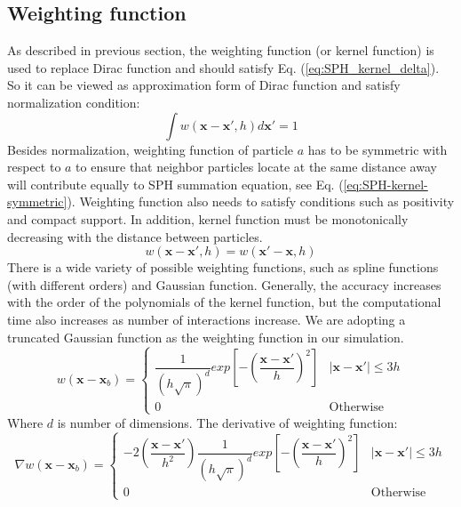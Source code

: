 \documentclass[journal abbreviation, manuscript]{copernicus}
\begin{document}
\subsection{Weighting function}
As described in previous section, the weighting function (or kernel function) is used to replace Dirac function and should satisfy Eq.  (\ref{eq:SPH_kernel_delta}). So it can be viewed as approximation form of Dirac function and satisfy normalization condition:
\begin{equation}
\int	 w(\textbf{x}-\textbf{x}\prime, h) d\textbf{x}\prime = 1
\label{eq:SPH-kernel-normalization-prop}
\end{equation}
Besides normalization, weighting function of particle $a$ has to be symmetric with respect to $a$ to ensure that neighbor particles locate at the same distance away will contribute equally to SPH summation equation, see Eq. (\ref{eq:SPH-kernel-symmetric}). Weighting function also needs to satisfy conditions such as positivity and compact support. In addition, kernel function must be monotonically decreasing with the distance between particles.\\
\begin{equation}
w(\textbf{x}- \textbf{x} \prime, h) = w(\textbf{x} \prime - \textbf{x}, h)
\label{eq:SPH-kernel-symmetric}
\end{equation}
There is a wide variety of possible weighting functions, such as spline functions (with different orders) and Gaussian function. Generally, the accuracy increases with the order of the polynomials of the kernel function, but the computational time also increases as number of interactions increase. 
We are adopting a truncated Gaussian function as the weighting function in our simulation.
\begin{equation}
w(\textbf{x} - \textbf{x}_b) = 
\begin{cases} 
      \dfrac{1}{(h \sqrt{\pi})^d} exp [- (\dfrac{\textbf{x} - \textbf{x} \prime}{h})^2 ] &  \vert \textbf{x} - \textbf{x} \prime \vert \leq 3h\\
      0 & \text{Otherwise}
\end{cases}
\label{eq:SPH-kernel}
\end{equation}
Where $d$ is number of dimensions.
The derivative of weighting function:
\begin{equation}
\nabla w(\textbf{x} - \textbf{x}_b) = 
\begin{cases} 
      -2(\dfrac{\textbf{x} - \textbf{x} \prime}{h^2}) \dfrac{1}{(h \sqrt{\pi})^d} exp [- (\dfrac{\textbf{x} - \textbf{x} \prime}{h})^2 ] &  \vert \textbf{x} - \textbf{x} \prime \vert \leq 3h\\
      0 & \text{Otherwise}
\end{cases}
\end{equation}
\end{document}
